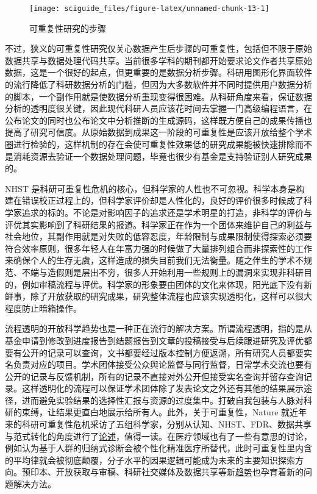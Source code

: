 \documentclass[]{tufte-book}
\begin{document}
\begin{figure}
\texttt{[image: sciguide\_files/figure-latex/unnamed-chunk-13-1]} \caption[可重复性研究的步骤]{可重复性研究的步骤}\label{fig:unnamed-chunk-13}
\end{figure}

不过，狭义的可重复性研究仅关心数据产生后步骤的可重复性，包括但不限于原始数据共享与数据处理代码共享。当前很多学科的期刊都开始要求论文作者共享原始数据，这是一个很好的起点，但更重要的是数据分析步骤。科研用图形化界面软件的流行降低了科研数据分析的门槛，但因为大多数软件并不同时提供用户数据分析的脚本，一个副作用就是使数据分析重现变得很困难。从科研角度来看，保证数据分析的透明度很关键，因此现代科研人员应该花时间去掌握一门高级编程语言，在公布论文的同时也公布论文中分析推断的生成源码，这样既方便自己的成果传播也提高了研究可信度。从原始数据到成果这一阶段的可重复性是应该开放给整个学术圈进行检验的，这样机制的存在会使可重复性效果低的研究成果能被快速排除而不是消耗资源去验证一个数据处理问题，毕竟也很少有基金是支持验证别人研究成果的。

NHST 是科研可重复性危机的核心，但科学家的人性也不可忽视。科学本身是构建在错误校正过程上的，但科学家评价却是人性化的，良好的评价很多时候成了科学家追求的标的。不论是对影响因子的追求还是学术明星的打造，非科学的评价与评优其实影响到了科研结果的报道。科学家正在作为一个团体来维护自己的利益与社会地位，其副作用就是对失败的低容忍度，年龄限制与成果限制使得探索必须要符合效率原则，很多年轻人在年富力强的时候做了大量排列组合而非探索性的工作来确保个人的生存无虞，这样造成的损失目前我们无法衡量。随之伴生的学术不规范、不端与造假则是层出不穷，很多人开始利用一些规则上的漏洞来实现非科研目的，例如审稿流程与评优。科学家的形象要由团体的文化来体现，阳光底下没有新鲜事，除了开放获取的研究成果，研究整体流程也应该实现透明化，这样可以很大程度防止暗箱操作。

流程透明的开放科学趋势也是一种正在流行的解决方案。所谓流程透明，指的是从基金申请到修改到进度报告到结题报告到文章的投稿接受与后续跟进研究及评优都要有公开的记录可以查询，文书都要经过版本控制方便返溯，所有研究人员都要实名负责对应的项目。学术团体接受公众舆论监督与同行监督，日常学术交流也要有公开的记录与反馈机制，所有的记录不直接对外公开但接受实名查询并留存查询记录。这样透明化的流程可以保证学术团体除了发表论文之外还有其他的结果展示途径，进而避免实验结果的选择性汇报与资源的过度集中。打破自我包装与人脉对科研的束缚，让结果更直白地展示给所有人。此外，关于可重复性，Nature 就近年来的科研可重复性危机采访了五组科学家，分别从认知、NHST、FDR、数据共享与范式转化的角度进行了\href{https://www.nature.com/articles/d41586-017-07522-z}{论述}，值得一读。在医疗领域也有了一些有意思的讨论，例如认为基于人群的归纳式诊断会被个性化精准医疗所替代，此时可重复性里内含的平均律就会被彻底颠覆，分子水平的因果逻辑可能成为未来的主要知识探索方向。预印本、开放获取与审稿、科研社交媒体及数据共享等新\href{https://theoreticalecology.wordpress.com/2019/01/22/tree-species-richness-and-its-effects-on-productivity-neither-global-nor-consistent/}{趋势}也孕育着新的问题解决方法。
\end{document}
